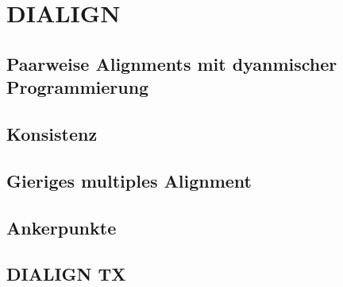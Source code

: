 \chapter{DIALIGN}
\label{ch:DIALIGN}

\section{Paarweise Alignments mit dyanmischer Programmierung}

\section{Konsistenz}

\section{Gieriges multiples Alignment}

\section{Ankerpunkte}

\section{DIALIGN TX}